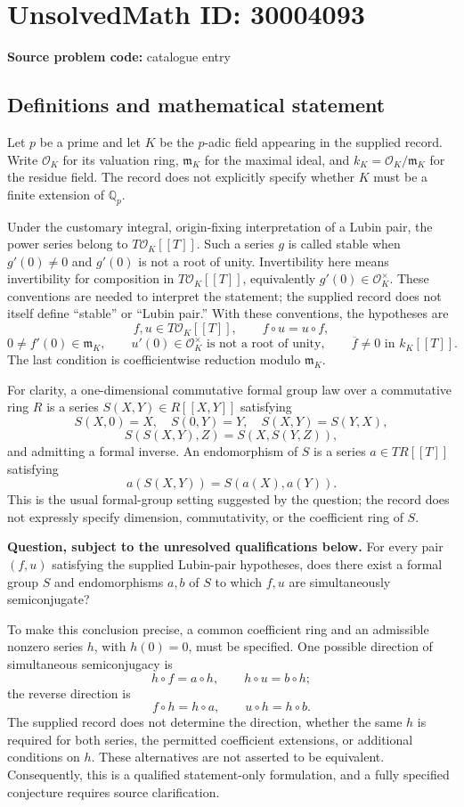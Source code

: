 \documentclass[11pt]{article}
\newcommand{\Q}{\mathbb{Q}}
\begin{document}
\section*{UnsolvedMath ID: 30004093}
\textbf{Source problem code:} catalogue entry
\subsection{Definitions and mathematical statement}
Let \(p\) be a prime and let \(K\) be the \(p\)-adic field appearing in the supplied record. Write \(\mathcal O_K\) for its valuation ring, \(\mathfrak m_K\) for the maximal ideal, and \(k_K=\mathcal O_K/\mathfrak m_K\) for the residue field. The record does not explicitly specify whether \(K\) must be a finite extension of \(\Q_p\).

Under the customary integral, origin-fixing interpretation of a Lubin pair, the power series belong to \(T\mathcal O_K[[T]]\). Such a series \(g\) is called stable when \(g'(0)\ne0\) and \(g'(0)\) is not a root of unity. Invertibility here means invertibility for composition in \(T\mathcal O_K[[T]]\), equivalently \(g'(0)\in\mathcal O_K^\times\). These conventions are needed to interpret the statement; the supplied record does not itself define ``stable'' or ``Lubin pair.'' With these conventions, the hypotheses are
\[
 f,u\in T\mathcal O_K[[T]],\qquad f\circ u=u\circ f,
\]
\[
 0\ne f'(0)\in\mathfrak m_K,\qquad
 u'(0)\in\mathcal O_K^\times\text{ is not a root of unity},\qquad
 \overline f\ne0\text{ in }k_K[[T]].
\]
The last condition is coefficientwise reduction modulo \(\mathfrak m_K\).

For clarity, a one-dimensional commutative formal group law over a commutative ring \(R\) is a series \(S(X,Y)\in R[[X,Y]]\) satisfying
\[
 S(X,0)=X,\quad S(0,Y)=Y,\quad S(X,Y)=S(Y,X),
\]
\[
 S(S(X,Y),Z)=S(X,S(Y,Z)),
\]
and admitting a formal inverse. An endomorphism of \(S\) is a series \(a\in TR[[T]]\) satisfying
\[
 a(S(X,Y))=S(a(X),a(Y)).
\]
This is the usual formal-group setting suggested by the question; the record does not expressly specify dimension, commutativity, or the coefficient ring of \(S\).

\textbf{Question, subject to the unresolved qualifications below.} For every pair \((f,u)\) satisfying the supplied Lubin-pair hypotheses, does there exist a formal group \(S\) and endomorphisms \(a,b\) of \(S\) to which \(f,u\) are simultaneously semiconjugate?

To make this conclusion precise, a common coefficient ring and an admissible nonzero series \(h\), with \(h(0)=0\), must be specified. One possible direction of simultaneous semiconjugacy is
\[
 h\circ f=a\circ h,\qquad h\circ u=b\circ h;
\]
the reverse direction is
\[
 f\circ h=h\circ a,\qquad u\circ h=h\circ b.
\]
The supplied record does not determine the direction, whether the same \(h\) is required for both series, the permitted coefficient extensions, or additional conditions on \(h\). These alternatives are not asserted to be equivalent. Consequently, this is a qualified statement-only formulation, and a fully specified conjecture requires source clarification.
\end{document}
